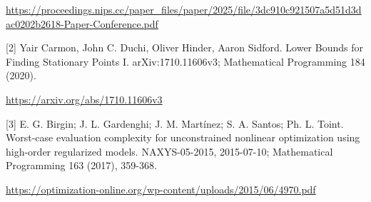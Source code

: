 \documentclass[10pt,a4paper]{article}
\begin{document}
\url{https://proceedings.nips.cc/paper_files/paper/2025/file/3dc910c921507a5d51d3dac0202b2618-Paper-Conference.pdf}

[2] Yair Carmon, John C. Duchi, Oliver Hinder, Aaron Sidford. Lower Bounds for Finding Stationary Points I. arXiv:1710.11606v3; Mathematical Programming 184 (2020).

\url{https://arxiv.org/abs/1710.11606v3}

[3] E. G. Birgin; J. L. Gardenghi; J. M. Martínez; S. A. Santos; Ph. L. Toint. Worst-case evaluation complexity for unconstrained nonlinear optimization using high-order regularized models. NAXYS-05-2015, 2015-07-10; Mathematical Programming 163 (2017), 359-368.

\url{https://optimization-online.org/wp-content/uploads/2015/06/4970.pdf}
\end{document}
